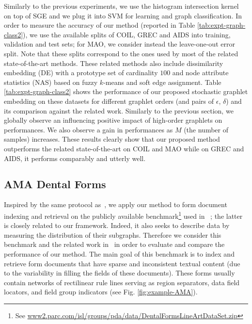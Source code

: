 \documentclass[journal]{IEEEtran}
\theoremstyle{definition}
\newcommand{\fig}[1]{Fig. \ref{#1}}
\newcommand{\tab}[1]{Table \ref{#1}}
\begin{document}
Similarly to the previous experiments, we use the histogram intersection kernel~\cite{Barla2003} on top of SGE and we plug it into SVM for learning and graph classification. In order to measure the accuracy of our method (reported in \tab{tab:expt-graph-class2}), we use the available splits of COIL, GREC and AIDS into training, validation and test sets; for MAO, we consider instead the leave-one-out error split. Note that these splits correspond to the ones used by most of the related state-of-the-art methods. These related methods also include dissimilarity embedding (DE) with a prototype set of cardinality $100$ and node attribute statistics (NAS) based on fuzzy $k$-means and soft edge assignment. \tab{tab:expt-graph-class2} shows the performance of our proposed stochastic graphlet embedding on these datasets for different graphlet orders (and pairs of $\epsilon$, $\delta$) and its comparison against the related work. Similarly to the previous section, we globally observe an influencing positive impact of high-order graphlets on performances. We also observe a gain in performances as $M$ (the number of samples) increases. These results clearly show that our proposed method outperforms the related state-of-the-art on COIL and MAO while on GREC and AIDS, it performs comparably and utterly well.

\subsection{AMA Dental Forms}
Inspired by the same protocol as~\cite{Saund2013}, we apply our method to form document indexing and retrieval on the publicly available benchmark\footnote{See \url{www2.parc.com/isl/groups/pda/data/DentalFormsLineArtDataSet.zip}} used in ~\cite{Saund2013}; the latter is closely related to our framework. Indeed, it also seeks to describe data by measuring the distribution of their subgraphs. Therefore we consider this benchmark and the related work in~\cite{Saund2013} in order to evaluate and compare the performance of our method. The main goal of this benchmark is to index and retrieve form documents that have sparse and inconsistent textual content (due to the variability in filling the fields of these documents). These forms usually contain networks of rectilinear rule lines serving as region separators, data field locators, and field group indicators (see \fig{fig:example-AMA}).
 
\end{document}
